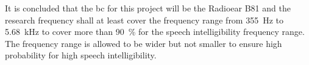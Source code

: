 It is concluded that the \gls{bc} for this project will be the Radioear B81 and the research frequency shall at least cover the frequency range from \SI{355}{\hertz} to \SI{5.68}{\kilo\hertz} to cover more than \SI{90}{\percent} for the speech intelligibility frequency range. The frequency range is allowed to be wider but not smaller to ensure high probability for high speech intelligibility.